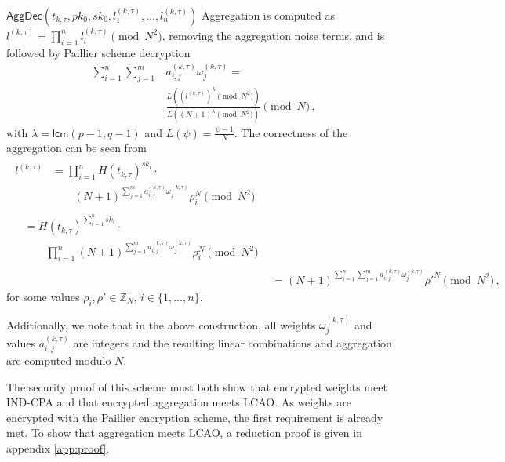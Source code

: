 \documentclass[10pt,letterpaper,oneside,twocolumn,journal]{IEEEtran}
\theoremstyle{definition}
\theoremstyle{definition}
\theoremstyle{remark}
\begin{document}
\begin{LaTeXdescription}
    \item[$\mathsf{AggDec}(t_{k,\tau}, pk_0, sk_0, l^{(k,\tau)}_1,\dots,l^{(k,\tau)}_n)$] Aggregation is computed as $l^{(k,\tau)} = \prod^n_{i=1}l^{(k,\tau)}_i \pmod{N^2}$, removing the aggregation noise terms, and is followed by Paillier scheme decryption
    \begin{equation}
        \begin{split}
            \sum^{n}_{i=1}\sum^{m}_{j=1}&a^{(k,\tau)}_{i,j}\omega^{(k,\tau)}_j =\\
            &\frac{L((l^{(k,\tau)})^\lambda\pmod{N^2})}{L((N+1)^\lambda\pmod{N^2})} \pmod{N}\,,
        \end{split} \label{eqn:our_scheme_decrypt}
    \end{equation}
    with $\lambda = \mathsf{lcm}(p-1, q-1)$ and $L(\psi) = \frac{\psi-1}{N}$. The correctness of the aggregation can be seen from
    \begin{align*}
        \begin{split}
        l^{(k,\tau)} &= \prod^n_{i=1}H(t_{k,\tau})^{sk_i}\cdot \\
        &\qquad (N+1)^{\sum^{m}_{j=1}a^{(k,\tau)}_{i,j}\omega^{(k,\tau)}_j}\rho_i^N \!\!\pmod{N^2}
        \end{split}\\
        \begin{split}
            &= H(t_{k,\tau})^{\sum^n_{i=1}sk_i}\cdot \\
            &\qquad \prod^n_{i=1}(N+1)^{\sum^{m}_{j=1}a^{(k,\tau)}_{i,j}\omega^{(k,\tau)}_j}\rho_i^N \!\!\pmod{N^2}
        \end{split}\\
        &= (N+1)^{\sum^n_{i=1}\sum^{m}_{j=1}a^{(k,\tau)}_{i,j}\omega^{(k,\tau)}_j}\rho'^N \!\!\pmod{N^2}\,,
    \end{align*}
    for some values $\rho_i,\rho' \in \mathbb{Z}_N,\,i\in\{1,\dots,n\}$.
\end{LaTeXdescription}
Additionally, we note that in the above construction, all weights $\omega^{(k,\tau)}_j$ and values $a^{(k,\tau)}_{i,j}$ are integers and the resulting linear combinations and aggregation are computed modulo $N$. 

The security proof of this scheme must both show that encrypted weights meet IND-CPA and that encrypted aggregation meets LCAO. As weights are encrypted with the Paillier encryption scheme, the first requirement is already met. To show that aggregation meets LCAO, a reduction proof is given in appendix \ref{app:proof}.
\end{document}
